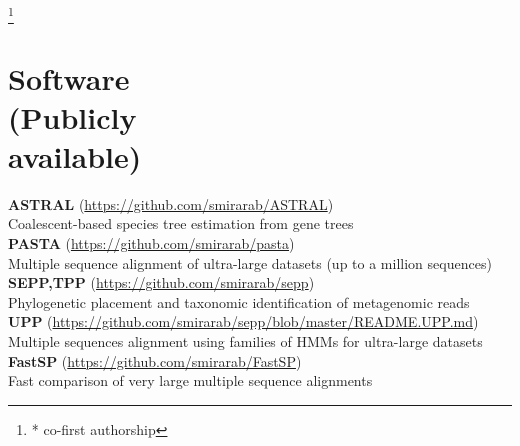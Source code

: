 \documentclass[margin,line,letterpaper]{resume}
\begin{document}
\begin{resume}
\newcommand\blfootnote[1]{%
  \begingroup
  \renewcommand\thefootnote{}\footnote{#1}%
  \addtocounter{footnote}{-1}%
  \endgroup
}
    
\def\FormatName#1{%
  \def\myname{Siavash Mirarab}
  \def\mynamee{Siavash Mirarab)*}%
  \edef\name{#1}%
  \ifx\name\myname
    \textbf{#1}%
  \else
    \ifx\name\mynamee
       \textbf{Siavash Mirarab})*%
    \else
      #1%
    \fi
  \fi
}

\vspace{-26pt}
\blfootnote{* co-first authorship}
\begin{spacing}{1.2}

\end{spacing}

\vspace{-10pt}

\section{\mysidestyle Software\\(Publicly\\available)}
\textbf{ASTRAL} (\url{https://github.com/smirarab/ASTRAL})\\
Coalescent-based species tree estimation from  gene trees\vspace{2mm}\\
\textbf{PASTA} (\url{https://github.com/smirarab/pasta})\\ 
Multiple sequence alignment of ultra-large datasets (up to a million sequences)\vspace{2mm}\\
\textbf{SEPP,TPP} (\url{https://github.com/smirarab/sepp})\\
Phylogenetic placement and taxonomic identification of metagenomic reads\vspace{2mm}\\
\textbf{UPP} (\url{https://github.com/smirarab/sepp/blob/master/README.UPP.md})\\
Multiple sequences alignment using families of HMMs for ultra-large datasets\vspace{2mm}\\
\textbf{FastSP} (\url{https://github.com/smirarab/FastSP})\\
Fast comparison of very large multiple sequence alignments  


\end{resume}
\end{document}
